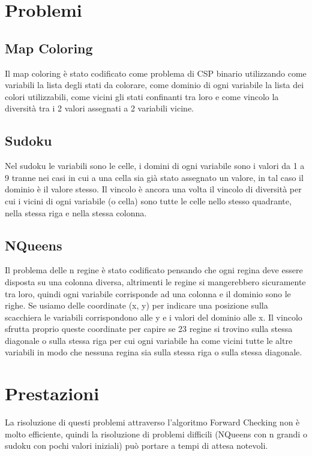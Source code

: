 \documentclass[11pt]{article}
\begin{document}
\section{Problemi}
\subsection{Map Coloring}
Il map coloring è stato codificato come problema di CSP binario utilizzando come variabili la lista degli stati da colorare, come dominio di ogni variabile la lista dei colori utilizzabili, come vicini gli stati confinanti tra loro e come vincolo la diversità tra i 2 valori assegnati a 2 variabili vicine.
\subsection{Sudoku}
Nel sudoku le variabili sono le celle, i domini di ogni variabile sono i valori da 1 a 9 tranne nei casi in cui a una cella sia già stato assegnato un valore, in tal caso il dominio è il valore stesso. Il vincolo è ancora una volta il vincolo di diversità per cui i vicini di ogni variabile (o cella) sono tutte le celle nello stesso quadrante, nella stessa riga e nella stessa colonna. 
\subsection{NQueens}
Il problema delle n regine è stato codificato pensando che ogni regina deve essere disposta su una colonna diversa, altrimenti le regine si mangerebbero sicuramente tra loro, quindi ogni variabile corrisponde ad una colonna e il dominio sono le righe. Se usiamo delle coordinate (x, y) per indicare una posizione sulla scacchiera le variabili corrispondono alle y e i valori del dominio alle x. Il vincolo sfrutta proprio queste coordinate per capire se 23 regine si trovino sulla stessa diagonale o sulla stessa riga per cui ogni variabile ha come vicini tutte le altre variabili in modo che nessuna regina sia sulla stessa riga o sulla stessa diagonale.
\section{Prestazioni}
La risoluzione di questi problemi attraverso l’algoritmo Forward Checking non è molto efficiente, quindi la risoluzione di problemi difficili (NQueens con n grandi o sudoku con pochi valori iniziali) può portare a tempi di attesa notevoli.
\end{document}
